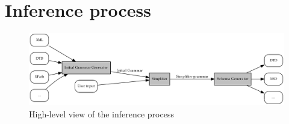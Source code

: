 \documentclass[a4paper,10pt,oneside]{article}
\newcommand{\myscale}{0.74}
\begin{document}

\section{Inference process}
\begin{figure}
	\caption{High-level view of the inference process} \label{inference_process}
	\centering\includegraphics[scale=\myscale]{inference_process}
\end{figure}

\end{document}
